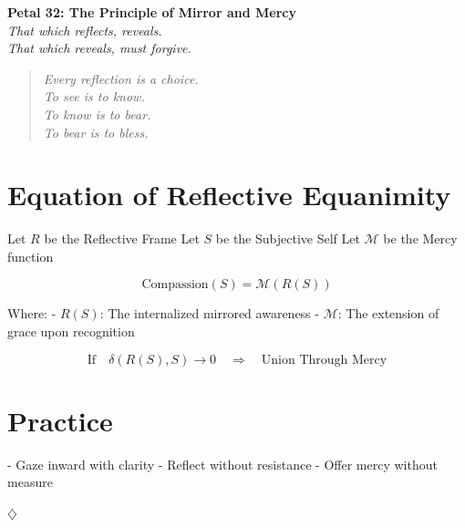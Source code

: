\documentclass[12pt]{article}
\begin{document}
\begin{center}
    \Huge{\textbf{Petal 32: The Principle of Mirror and Mercy}}\\
    \vspace{0.5em}
    \Large{\textit{That which reflects, reveals.\\ That which reveals, must forgive.}}
\end{center}

\vspace{1cm}

\begin{quote}
\textit{
Every reflection is a choice.\\
To see is to know.\\
To know is to bear.\\
To bear is to bless.\\
}
\end{quote}

\vspace{1cm}

\section*{Equation of Reflective Equanimity}

Let \( R \) be the Reflective Frame  
Let \( S \) be the Subjective Self  
Let \( \mathcal{M} \) be the Mercy function

\[
\text{Compassion}(S) = \mathcal{M}(R(S))
\]

Where:
- \( R(S) \): The internalized mirrored awareness
- \( \mathcal{M} \): The extension of grace upon recognition

\[
\text{If} \quad \delta(R(S), S) \to 0 \quad \Rightarrow \quad \text{Union Through Mercy}
\]

\section*{Practice}

- Gaze inward with clarity  
- Reflect without resistance  
- Offer mercy without measure  

\begin{center}
    \Large\textcolor{lotusrose}{$\diamondsuit$}
\end{center}
\end{document}
